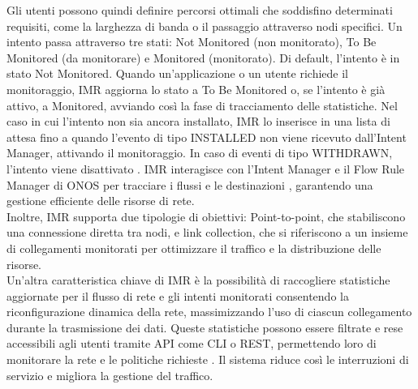 Gli utenti possono quindi definire percorsi ottimali che soddisfino determinati requisiti, come la larghezza di banda o il passaggio attraverso nodi specifici.
Un intento passa attraverso tre stati: Not Monitored (non monitorato), To Be Monitored (da monitorare) e Monitored (monitorato). 
Di default, l'intento è in stato Not Monitored. Quando un'applicazione o un utente richiede il monitoraggio, IMR aggiorna lo stato a To Be Monitored o, se l'intento è già attivo, a Monitored, avviando così la fase di tracciamento delle statistiche.
Nel caso in cui l'intento non sia ancora installato, IMR lo inserisce in una lista di attesa fino a quando l'evento di tipo INSTALLED non viene ricevuto dall'Intent Manager, attivando il monitoraggio.
In caso di eventi di tipo WITHDRAWN, l'intento viene disattivato \cite{onosint}.
IMR interagisce con l'Intent Manager e il Flow Rule Manager di ONOS per tracciare i flussi e le destinazioni \cite{onosint}, garantendo una gestione efficiente delle risorse di rete. 
\\Inoltre, IMR supporta due tipologie di obiettivi: Point-to-point, che stabiliscono una connessione diretta tra nodi, e 
link collection, che si riferiscono a un insieme di collegamenti monitorati per ottimizzare il traffico e la distribuzione delle risorse.
\\Un'altra caratteristica chiave di IMR è la possibilità di raccogliere statistiche aggiornate per il flusso di rete e gli intenti monitorati 
consentendo la riconfigurazione dinamica della rete, massimizzando l'uso di ciascun collegamento durante la trasmissione dei dati.
Queste statistiche possono essere filtrate e rese accessibili agli utenti tramite API come CLI o REST, permettendo loro di monitorare la rete e le politiche richieste \cite{ONOSart}. 
Il sistema riduce così le interruzioni di servizio e migliora la gestione del traffico.

